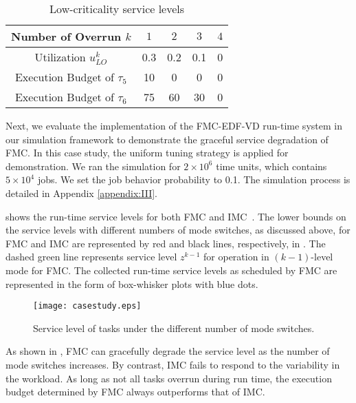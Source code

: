 \documentclass[10pt,journal,compsoc]{IEEEtran}
\begin{document}
{\begin{table}[h]
\centering
\caption{Low-criticality service levels}
\label{ex:e4}
\begin{tabular}{|c|c|c|c|c|}
\hline
Number of Overrun $k$    & $1$   & $2$    & $3$    & $4$  \\ \hline
Utilization $u_{LO}^{k}$ & 0.3   & 0.2    & 0.1    & 0  \\ \hline
Execution Budget of $\tau_5$      & 10   & 0      & 0      & 0 \\ \hline
Execution Budget of $\tau_6$      & 75   & 60      & 30      & 0 \\ \hline
\end{tabular}
\end{table}
}

Next, we evaluate the implementation of the FMC-EDF-VD run-time system in our simulation framework to demonstrate the graceful \lo service degradation of FMC. In this case study, the uniform tuning strategy is applied for demonstration. We ran the simulation for $2\times{}10^6$ time units, which contains $5\times{}10^4$ \hi jobs. We set the \hi job behavior probability to 0.1. The simulation process is detailed in Appendix \ref{appendix:III}.

 shows the run-time service levels for both FMC and IMC~\cite{DiLiu}.
The lower bounds on the service levels with different numbers of mode switches, as discussed above, for FMC and IMC are represented by red and black lines, respectively, in . The dashed green line represents service level $z^{k-1}$ for operation in $(k-1)$-level \hi mode for FMC. The collected run-time service levels as scheduled by FMC are represented in the form of box-whisker plots with blue dots.      
\begin{figure}
\centering
\texttt{[image: casestudy.eps]}
 \caption{Service level of \lo tasks under the different number of mode switches.}
  \label{fig:gd}
\end{figure}

As shown in , FMC can gracefully degrade the \lo service level as the number of mode switches increases. By contrast, IMC fails to respond to the variability in the workload. As long as not all \hi tasks overrun during run time, the execution budget determined by FMC always outperforms that of IMC. 
\end{document}
